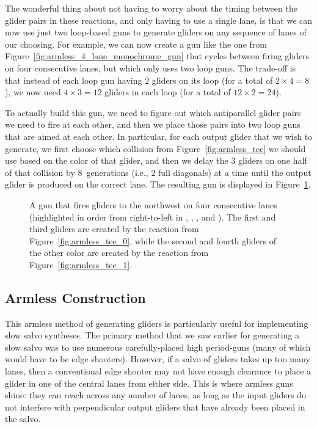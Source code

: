 The wonderful thing about not having to worry about the timing between the glider pairs in these reactions, and only having to use a single lane, is that we can now use just two loop-based guns to generate gliders on any sequence of lanes of our choosing. For example, we can now create a gun like the one from Figure~\ref{fig:armless_4_lane_monochrome_gun} that cycles between firing gliders on four consecutive lanes, but which only uses two loop guns. The trade-off is that instead of each loop gun having $2$ gliders on its loop (for a total of $2 \times 4 = 8$), we now need $4 \times 3 = 12$ gliders in each loop (for a total of $12 \times 2 = 24$).

To actually build this gun, we need to figure out which antiparallel glider pairs we need to fire at each other, and then we place those pairs into two loop guns that are aimed at each other. In particular, for each output glider that we wish to generate, we first choose which collision from Figure~\ref{fig:armless_tee} we should use based on the color of that glider, and then we delay the $3$ gliders on one half of that collision by $8$~generations (i.e., $2$ full diagonals) at a time until the output glider is produced on the correct lane. The resulting gun is displayed in Figure~\ref{fig:armless_4_lane_gun}.

\begin{figure}[!htb]
	\centering
	\caption{A gun that fires gliders to the northwest on four consecutive lanes (highlighted in order from right-to-left in , , , and ). The first and third gliders are created by the reaction from Figure~\ref{fig:armless_tee_0}, while the second and fourth gliders of the other color are created by the reaction from Figure~\ref{fig:armless_tee_1}.}\label{fig:armless_4_lane_gun}
\end{figure}


\subsection{Armless Construction}\label{sec:armless_construction_subsec}

This armless method of generating gliders is particularly useful for implementing slow salvo syntheses. The primary method that we saw earlier for generating a slow salvo was to use numerous carefully-placed high period-guns (many of which would have to be edge shooters). However, if a salvo of gliders takes up too many lanes, then a conventional edge shooter may not have enough clearance to place a glider in one of the central lanes from either side. This is where armless guns shine: they can reach across any number of lanes, as long as the input gliders do not interfere with perpendicular output gliders that have already been placed in the salvo.


